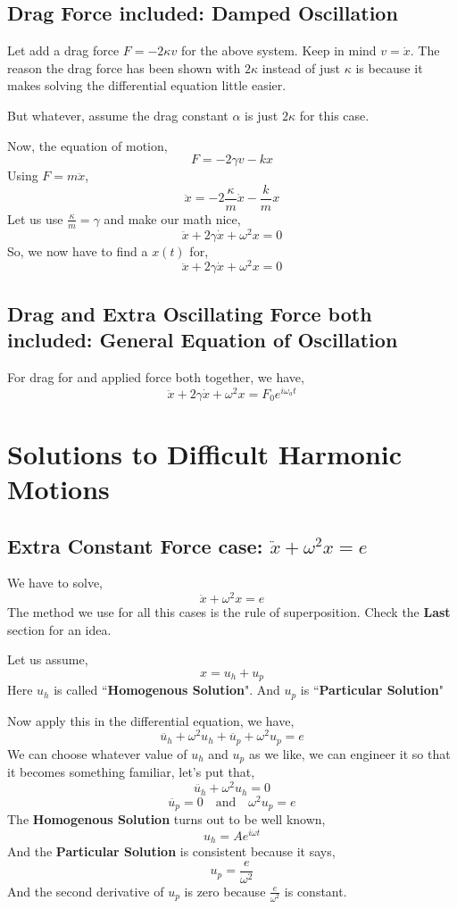\documentclass[11pt, a4paper]{memoir}
\begin{document}
\subsection{ Drag Force included: Damped Oscillation} 
Let add a drag force $F = - 2 \kappa v$ for the above system. Keep in mind $v = \dot{x}$. The reason the drag force has been shown with $2 \kappa $ instead of just $\kappa$ is because it makes solving the differential equation little easier. 

But whatever, assume the drag constant $\alpha$ is just $2 \kappa$ for this case. 

Now, the equation of motion,
\[ 
F = - 2 \gamma v - k x
\]
Using $F = m \ddot{x}$,
\[ 
\ddot{x} = - 2 \frac{\kappa }{m} \dot{x} - \frac{k}{m} x    
\]
Let us use $\frac{\kappa}{m} = \gamma$ and make our math nice,
\[ 
\ddot{x} + 2 \gamma \dot{x} + \omega^2 x = 0
\]
So, we now have to find a $x \left( t \right) $ for,
\[ 
\boxed{ \ddot{x} + 2 \gamma \dot{x} + \omega^2 x = 0}
\]

\subsection{ Drag and Extra Oscillating Force both included: General Equation of Oscillation}

For drag for and applied force both together, we have,
\[ 
    \boxed{ \ddot{x} + 2 \gamma \dot{x} + \omega^2 x = F_0 e^{i \omega_{ a}t}}
\]



\section{ Solutions to Difficult Harmonic Motions}
\subsection{ Extra Constant Force case: $ \ddot{x} + \omega^2 x = e$}
We have to solve,
\[ 
\boxed{ \ddot{x} + \omega^2 x = e}
\]
The method we use for all this cases is the rule of superposition. Check the \textbf{Last} section for an idea.

Let us assume,
\[ 
    \boxed{ x = u_{ h} + u_{ p}}
\]
Here $u_{ h} $ is called ``\textbf{Homogenous Solution}". And $u_{ p}$ is ``\textbf{Particular Solution}"

Now apply this in the differential equation, we have,
\[ 
\ddot{u _{ h}} + \omega^2 u_{ h} + \ddot{u_{ p}} + \omega^2 u_{ p}  = e
\]
We can choose whatever value of $u_{ h}$ and $u_{ p}$ as we like, we can engineer it so that it becomes something familiar, let's put that,
\[ 
\ddot{u_{ h}} + \omega^2 u_{ h} = 0
\]
\[ 
\ddot{u_{ p}} = 0 \quad \text{and} \quad \omega^2 u_{ p} = e
\]
The \textbf{Homogenous Solution} turns out to be well known,
\[ 
u_{ h } = A e^{i \omega t}
\]
And the \textbf{Particular Solution} is consistent because it says,
\[ 
u_{ p} = \frac{e}{\omega^2}
\] 
And the second derivative of $u_{ p}$ is zero because $\frac{e}{\omega^2}$ is constant.
\end{document}
